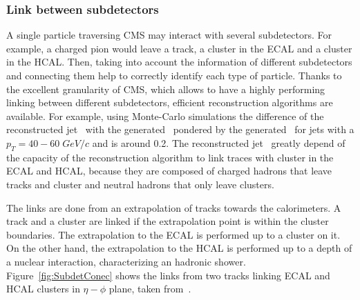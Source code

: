 \subsubsection{Link between subdetectors}

A single particle traversing CMS may interact with several subdetectors. For example, a charged pion would leave a track, a cluster in the ECAL and a cluster in the HCAL. Then, taking into account the information of different subdetectors and connecting them help to correctly identify each type of particle. Thanks to the excellent granularity of CMS, which allows to have a highly performing linking between different subdetectors, efficient reconstruction algorithms are available. For example, using Monte-Carlo simulations the difference of the reconstructed jet \pt~with the generated \pt~pondered by the generated \pt~for jets with a ${p_{T}=40-60\;GeV/c}$ and  is around 0.2. The reconstructed jet \pt~greatly depend of the capacity of the reconstruction algorithm to link traces with cluster in the ECAL and HCAL, because they are composed of charged hadrons that leave tracks and cluster and neutral hadrons that only leave clusters.

The links are done from an extrapolation of tracks towards the calorimeters. A track and a cluster are linked if the extrapolation point is within the cluster boundaries. The extrapolation to the ECAL is performed up to a cluster on it. On the other hand, the extrapolation to the HCAL is performed up to a  depth of a nuclear interaction, characterizing an hadronic shower. Figure~\ref{fig:SubdetConec} shows the links from two tracks linking ECAL and HCAL clusters in $\eta-\phi$ plane, taken from~\cite{Brochet:1956723}. %

